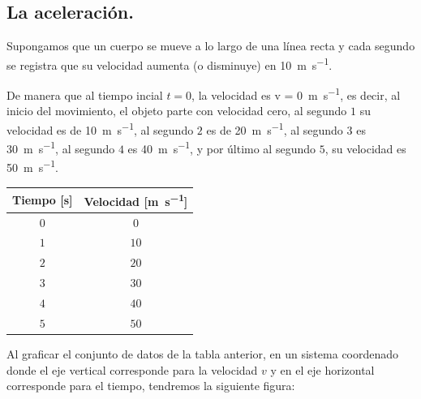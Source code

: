\documentclass[14pt]{extarticle}
\begin{document}
\subsection{La aceleración.}

Supongamos que un cuerpo se mueve a lo largo de una línea recta y cada segundo se registra que su velocidad aumenta (o disminuye) en \SI{10}{\meter\per\second}.

De manera que al tiempo incial $t = 0$, la velocidad es v = \SI{0}{\meter\per\second}, es decir, al inicio del movimiento, el objeto parte con velocidad cero, al segundo $1$ su velocidad es de \SI{10}{\meter\per\second},  al segundo $2$ es de \SI{20}{\meter\per\second},  al segundo $3$ es \SI{30}{\meter\per\second},  al segundo $4$ es \SI{40}{\meter\per\second},  y por último al segundo $5$, su velocidad es \SI{50}{\meter\per\second}.
\begin{table}[H]
\renewcommand{\arraystretch}{1}
\centering
\begin{tabular}{c | c}
Tiempo [\unit{\second}] & Velocidad [\unit{\meter\per\second}] \\ \hline
$0$ & $0$ \\ \hline
$1$ & $10$ \\ \hline
$2$ & $20$ \\ \hline
$3$ & $30$ \\ \hline
$4$ & $40$ \\ \hline
$5$ & $50$ \\ \hline
\end{tabular}
\end{table}

Al graficar el conjunto de datos de la tabla anterior, en un sistema coordenado donde el eje vertical corresponde para la velocidad $v$ y en el eje horizontal corresponde para el tiempo, tendremos la siguiente figura:
\begin{figure}[H]
    \centering
\end{figure}
\end{document}
